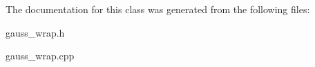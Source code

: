 The documentation for this class was generated from the following files\-:\begin{DoxyCompactItemize}
\item 
gauss\-\_\-wrap.\-h\item 
gauss\-\_\-wrap.\-cpp\end{DoxyCompactItemize}
